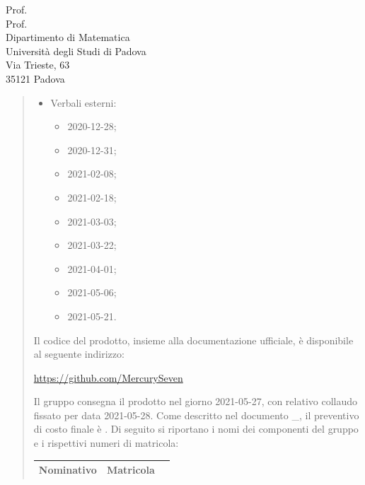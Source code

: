 \documentclass[a4paper,12pt]{letteracdp}
\begin{document}
\begin{letter}{
	Prof. \Tullio{} \\
	Prof. \Riccardo{} \\
	Dipartimento di Matematica \\
	Università degli Studi di Padova \\
	Via Trieste, 63 \\
	35121 Padova}
\begin{quotation}
\begin{itemize}
\begin{itemize}
			\item \docVI{}2021-02-01;
			\item \docVI{}2021-02-20;
			\item \docVI{}2021-03-18;
			\item \docVI{}2021-03-28;
			\item \docVI{}2021-04-16;
			\item \docVI{}2021-05-04;
			\item \docVI{}2021-05-21.
		\end{itemize}
		\item Verbali esterni:
		\begin{itemize}
			\item \docVE{}2020-12-28;
			\item \docVE{}2020-12-31;
			\item \docVE{}2021-02-08;
			\item \docVE{}2021-02-18;
			\item \docVE{}2021-03-03;
			\item \docVE{}2021-03-22;
			\item \docVE{}2021-04-01;
			\item \docVE{}2021-05-06;
			\item \docVE{}2021-05-21.
		\end{itemize}
\thispagestyle{empty}		
	\end{itemize}
Il codice del prodotto, insieme alla documentazione ufficiale, è disponibile al seguente indirizzo:\newline{}
\centerline{\url{https://github.com/MercurySeven}}\newline{}
Il gruppo consegna il prodotto nel giorno 2021-05-27, con relativo collaudo fissato per data 2021-05-28.\newline{}
Come descritto nel documento \docPdP{}\_\versPdP{}, il preventivo di costo finale è \textbf{}. \newline{}
Di seguito si riportano i nomi dei componenti del gruppo e i rispettivi numeri di matricola:
	
	
\renewcommand{\arraystretch}{1}
	\begin{table}
		\begin{center}
			\setlength{\aboverulesep}{0pt}
			\setlength{\belowrulesep}{0pt}
			\setlength{\extrarowheight}{.75ex}
			\begin{tabular}{ c c c }
				\rowcolor{AzzurroGruppo!30} 
				\textbf{Nominativo} & \textbf{Matricola}\\
				\toprule
				

\end{tabular}
\end{center}
\end{table}
\end{quotation}
\end{letter}
\end{document}
